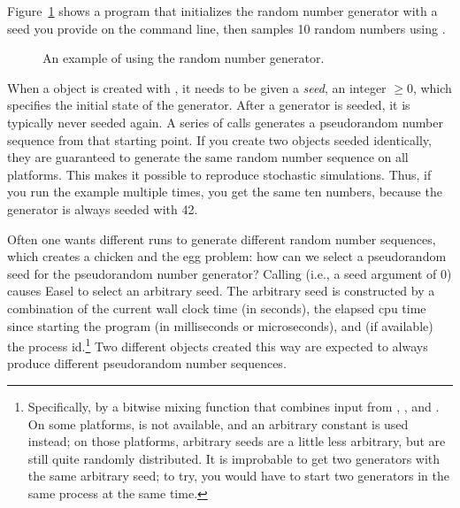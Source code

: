 Figure~\ref{fig:random_example} shows a program that initializes the
random number generator with a seed you provide on the command line,
then samples 10 random numbers using .

\begin{figure}

\caption{An example of using the random number generator.}
\label{fig:random_example}
\end{figure}

When a  object is created with
, it needs to be given a \emph{seed},
an integer $\geq 0$, which specifies the initial state of the
generator. After a generator is seeded, it is typically never seeded
again. A series of  calls generates a
pseudorandom number sequence from that starting point. If you create
two  objects seeded identically, they are
guaranteed to generate the same random number sequence on all
platforms. This makes it possible to reproduce stochastic simulations.
Thus, if you run the example multiple times, you get the same ten
numbers, because the generator is always seeded with 42.

Often one wants different runs to generate different random number
sequences, which creates a chicken and the egg problem: how can we
select a pseudorandom seed for the pseudorandom number generator?
Calling  (i.e., a seed argument of
0) causes Easel to select an arbitrary seed. The arbitrary seed is
constructed by a combination of the current wall clock time (in
seconds), the elapsed cpu time since starting the program (in
milliseconds or microseconds), and (if available) the process
id.\footnote{Specifically, by a bitwise mixing function that combines
  input from , , and . On
  some platforms,  is not available, and an arbitrary
  constant is used instead; on those platforms, arbitrary seeds are a
  little less arbitrary, but are still quite randomly distributed.  It
  is improbable to get two generators with the same arbitrary seed; to
  try, you would have to start two generators in the same process at
  the same time.} Two different  objects
created this way are expected to always produce different pseudorandom
number sequences.


